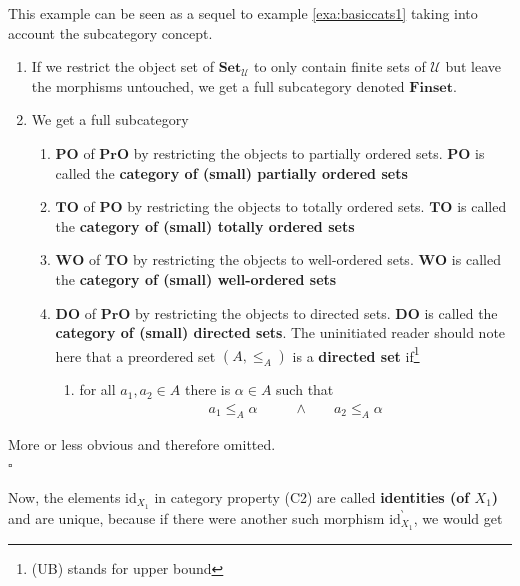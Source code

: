 \begin{exa}
\label{exa:basiccats2}
This example can be seen as a sequel to example \ref{exa:basiccats1} taking into account the subcategory concept.
\begin{enumerate}
\item[(a)]
If we restrict the object set of $\mathbf{Set}_{\mathcal{U}}$ to only contain finite sets of $\mathcal{U}$ but leave the morphisms untouched, we get a full subcategory denoted $\mathbf{Finset}$.
\item[(b)]
We get a full subcategory
\begin{enumerate}
\item[$\bullet$]
$\mathbf{PO}$ of $\mathbf{PrO}$ by restricting the objects to partially ordered sets.
$\mathbf{PO}$ is called the \textbf{category of (small) partially ordered sets}
\item[$\bullet$]
$\mathbf{TO}$ of $\mathbf{PO}$ by restricting the objects to totally ordered sets.
$\mathbf{TO}$ is called the \textbf{category of (small) totally ordered sets}
\item[$\bullet$]
$\mathbf{WO}$ of $\mathbf{TO}$ by restricting the objects to well-ordered sets.
$\mathbf{WO}$ is called the \textbf{category of (small) well-ordered sets}
\item[$\bullet$]
$\mathbf{DO}$ of $\mathbf{PrO}$ by restricting the objects to directed sets.
$\mathbf{DO}$ is called the \textbf{category of (small) directed sets}.
The uninitiated reader should note here that a preordered set $(A,\leq_{A})$ is a \textbf{directed set} if\footnote{(UB) stands for upper bound}
\begin{enumerate}
\item[(UB)]
for all $a_{1},a_{2} \in A$ there is $\alpha \in A$ such that
\begin{align*}
  a_{1}
  \leq_{A}
  \alpha
  \qquad
  &\land
  \qquad
  a_{2}
  \leq_{A}
  \alpha
\end{align*}
\end{enumerate}
\end{enumerate}
\end{enumerate}
\end{exa}
\begin{prf}
More or less obvious and therefore omitted.
\\
\phantom{proven}
\hfill
$\square$
\end{prf}
Now, the elements $\mathrm{id}_{X_{1}}$ in category property (C2) are called \textbf{identities (of $X_{1}$)} and are unique, because if there were another such morphism $\mathrm{id}_{X_{1}}^{\backprime}$, we would get
